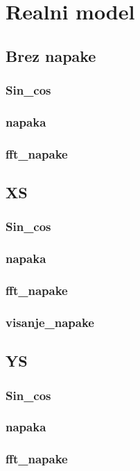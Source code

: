

\chapter{Realni model}
\section{Brez napake}
\subsection{Sin\_cos}
\subsection{napaka}
\subsection{fft\_napake}
\section{XS}
\subsection{Sin\_cos}
\subsection{napaka}
\subsection{fft\_napake}
\subsection{visanje\_napake}

\section{YS}
\subsection{Sin\_cos}
\subsection{napaka}
\subsection{fft\_napake}
